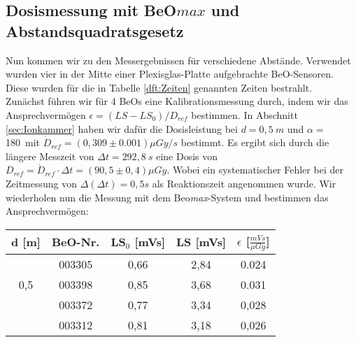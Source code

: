 \subsection{Dosismessung mit BeO$max$ und Abstandsquadratsgesetz}
Nun kommen wir zu den Messergebnissen für verschiedene Abstände. Verwendet wurden vier in der Mitte einer Plexisglas-Platte aufgebrachte BeO-Sensoren. Diese wurden für die in Tabelle \ref{dft:Zeiten} genannten Zeiten bestrahlt.\\ 
Zunächst führen wir für 4 BeOs eine Kalibrationsmessung durch, indem wir das Ansprechvermögen $\epsilon = (LS - LS_0)/D_{ref}$ bestimmen.
In Abschnitt \ref{sec:Ionkammer} haben wir dafür die Dosisleistung bei $d=0,5\ m$ und $\alpha =$ 180\textdegree \ mit $\dot{D}_{ref} = (0,309 \pm 0.001)\mu Gy /s$ bestimmt. Es ergibt sich durch die längere Messzeit von $\Delta t = 292,8\ s$ eine Dosis von $D_{ref} = \dot{D}_{ref} \cdot \Delta t = (90,5 \pm 0,4)\mu Gy$. Wobei ein systematischer Fehler bei der Zeitmessung von $\Delta(\Delta t) = 0,5s$ als Reaktionszeit angenommen wurde. Wir wiederholen nun die Messung mit dem Beo\textit{max}-System und bestimmen das Ansprechvermögen:\\

\minipanf
	\begin{center}	
		\begin{tabular}{c|c|c|c|c}
					\textbf{d} [m] & BeO-Nr. & \textbf{LS$_0$} [mVs] & \textbf{LS} [mVs] & \textbf{$\epsilon$} [$\frac{mVs}{\mu Gy}$] \\
			\hline  
								& 003305 & 0,66 & 2,84 & 0.024\\
						0,5		& 003398 & 0,85 & 3,68 & 0.031\\
								& 003372 & 0,77 & 3,34 & 0,028\\
								& 003312 & 0,81 & 3,18 & 0,026\\								
		\end{tabular}
	\end{center}
\minipend
\vspace{3mm}

